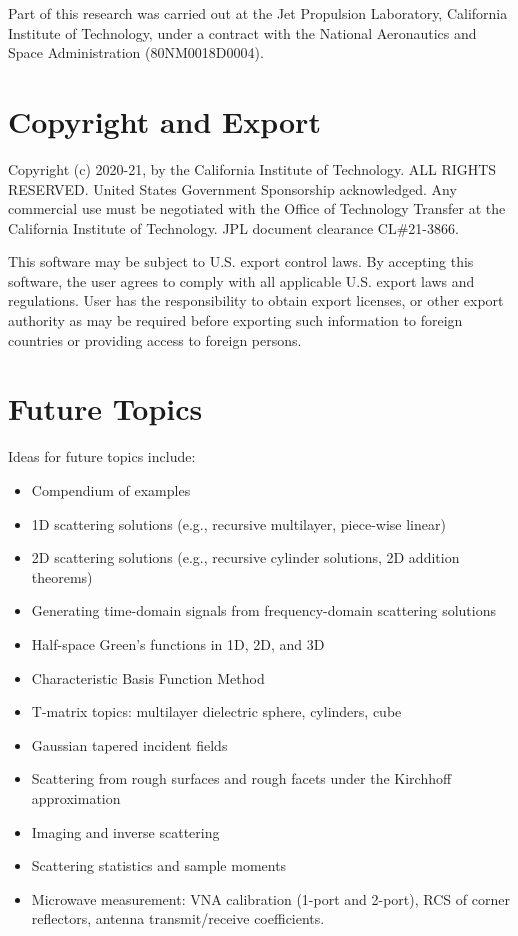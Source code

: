 Part of this research was carried out at the Jet Propulsion Laboratory, California Institute of Technology, under a contract with the National Aeronautics and Space Administration (80NM0018D0004).
\vspace{-3mm}
\section{Copyright and Export}
\vspace{-2mm}
Copyright (c) 2020-21, by the California Institute of Technology. ALL RIGHTS RESERVED. United States Government Sponsorship acknowledged. Any commercial use must be negotiated with the Office of Technology Transfer at the California Institute of Technology. JPL document clearance CL\#21-3866. 

This software may be subject to U.S. export control laws. By accepting this software, the user agrees to comply with all applicable U.S. export laws and regulations. User has the responsibility to obtain export licenses, or other export authority as may be required before exporting such information to foreign countries or providing access to foreign persons. 
\vspace{-3mm}
\section{Future Topics}
\vspace{-2mm}
Ideas for future topics include:
\begin{itemize}[topsep=0pt]
  \setlength{\itemsep}{1pt}
  \setlength{\parskip}{0pt}
  \setlength{\parsep}{0pt}
\item Compendium of examples
\item 1D scattering solutions (e.g., recursive multilayer, piece-wise linear)
\item 2D scattering solutions (e.g., recursive cylinder solutions, 2D addition theorems)
\item Generating time-domain signals from frequency-domain scattering solutions
\item Half-space Green's functions in 1D, 2D, and 3D
\item Characteristic Basis Function Method 
\item T-matrix topics: multilayer dielectric sphere, cylinders, cube
\item Gaussian tapered incident fields
\item Scattering from rough surfaces and rough facets under the Kirchhoff approximation
\item Imaging and inverse scattering 
\item Scattering statistics and sample moments
\item Microwave measurement: VNA calibration (1-port and 2-port), RCS of corner reflectors, antenna transmit/receive coefficients.
\end{itemize}



